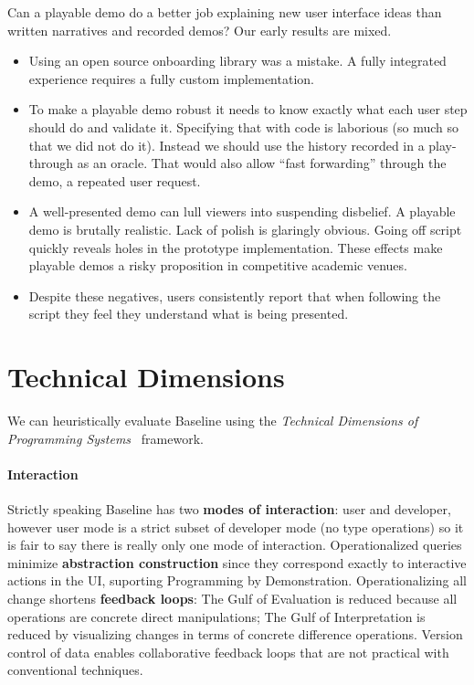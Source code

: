 \documentclass[english,submission]{programming}
\theoremstyle{definition}
\begin{document}
Can a playable demo do a better job explaining new user interface ideas than
written narratives and recorded demos? Our early results are mixed.

\begin{itemize}
\item Using an open source onboarding library was a mistake. A fully integrated experience requires a fully custom implementation.
\item To make a playable demo robust it needs to know exactly what each user step should do and validate it. Specifying that with code is laborious (so much so that we did not do it). Instead we should use the history recorded in a play-through as an oracle. That would also allow ``fast forwarding'' through the demo, a repeated user request.
\item A well-presented demo can lull viewers into suspending disbelief. A playable demo is brutally realistic. Lack of polish is glaringly obvious. Going off script quickly reveals holes in the prototype implementation. These effects make playable demos a risky proposition in competitive academic venues.
\item Despite these negatives, users consistently report that when following the script they feel they understand what is being presented.

\end{itemize}




\section{Technical Dimensions}\label{tech-dims}
We can heuristically evaluate Baseline using the \textit{Technical Dimensions of Programming Systems}~\cite{techdims} framework.

\paragraph{Interaction} Strictly speaking Baseline has two \textbf{modes of interaction}: user and developer, however user mode is a strict subset of developer mode (no type operations) so it is fair to say there is really only one mode of interaction.
Operationalized queries minimize \textbf{abstraction construction} since they correspond exactly to interactive actions in the UI, suporting Programming by Demonstration.
Operationalizing all change shortens \textbf{feedback loops}: The Gulf of Evaluation is reduced because all operations are concrete direct manipulations; The Gulf of Interpretation is reduced by visualizing changes in terms of concrete difference operations. Version control of data enables collaborative feedback loops that are not practical with conventional techniques.
\end{document}
